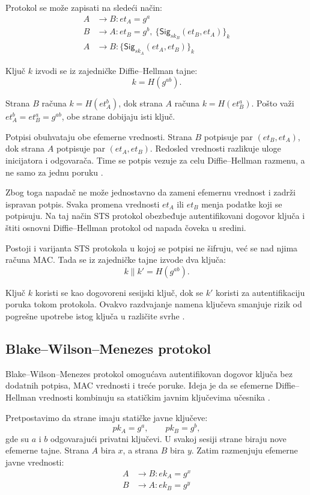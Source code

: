 Protokol se može zapisati na sledeći način:
\[
\begin{aligned}
A &\rightarrow B : et_A = g^a \\
B &\rightarrow A : et_B = g^b,\ \{ \mathsf{Sig}_{sk_B}(et_B, et_A) \}_{k} \\
A &\rightarrow B : \{ \mathsf{Sig}_{sk_A}(et_A, et_B) \}_{k}
\end{aligned}
\]

Ključ \(k\) izvodi se iz zajedničke Diffie--Hellman tajne:
\[
k = H(g^{ab}).
\]

Strana \(B\) računa \(k = H(et_A^b)\), dok strana \(A\) računa \(k = H(et_B^a)\). Pošto važi \(et_A^b = et_B^a = g^{ab}\), obe strane dobijaju isti ključ.

Potpisi obuhvataju obe efemerne vrednosti. Strana \(B\) potpisuje par \((et_B, et_A)\), dok strana \(A\) potpisuje par \((et_A, et_B)\). Redosled vrednosti razlikuje uloge inicijatora i odgovarača. Time se potpis vezuje za celu Diffie--Hellman razmenu, a ne samo za jednu poruku \cite{smart2016cryptography}.

Zbog toga napadač ne može jednostavno da zameni efemernu vrednost i zadrži ispravan potpis. Svaka promena vrednosti \(et_A\) ili \(et_B\) menja podatke koji se potpisuju. Na taj način STS protokol obezbeđuje autentifikovani dogovor ključa i štiti osnovni Diffie--Hellman protokol od napada čoveka u sredini.

Postoji i varijanta STS protokola u kojoj se potpisi ne šifruju, već se nad njima računa MAC. Tada se iz zajedničke tajne izvode dva ključa:
\[
k \parallel k' = H(g^{ab}).
\]

Ključ \(k\) koristi se kao dogovoreni sesijski ključ, dok se \(k'\) koristi za autentifikaciju poruka tokom protokola. Ovakvo razdvajanje namena ključeva smanjuje rizik od pogrešne upotrebe istog ključa u različite svrhe \cite{smart2016cryptography}.

\subsection{Blake--Wilson--Menezes protokol}

Blake--Wilson--Menezes protokol omogućava autentifikovan dogovor ključa bez dodatnih potpisa, MAC vrednosti i treće poruke. Ideja je da se efemerne Diffie--Hellman vrednosti kombinuju sa statičkim javnim ključevima učesnika \cite{smart2016cryptography}.


Pretpostavimo da strane imaju statičke javne ključeve:
\[
pk_A = g^a, \qquad pk_B = g^b,
\]
gde su \(a\) i \(b\) odgovarajući privatni ključevi. U svakoj sesiji strane biraju nove efemerne tajne. Strana \(A\) bira \(x\), a strana \(B\) bira \(y\). Zatim razmenjuju efemerne javne vrednosti:
\[
\begin{aligned}
A &\rightarrow B : ek_A = g^x \\
B &\rightarrow A : ek_B = g^y
\end{aligned}
\]


